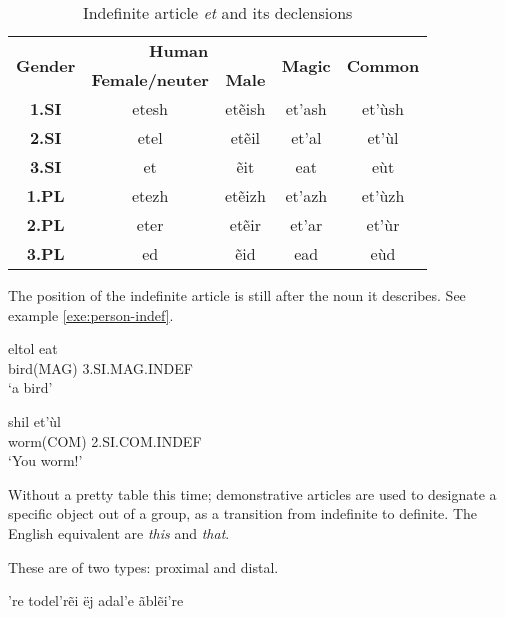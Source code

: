 \begin{table}[h]
\begin{center}\label{tab:morph-indef-pers-suff}
\begin{tabular}{|c||c|c|c|c|}
\hline
\multirow{2}{*}{\textbf{Gender}} & \multicolumn{2}{|c|}{\textbf{Human}} & \multirow{2}{*}{\textbf{Magic}} & \multirow{2}{*}{\textbf{Common}}\\
                                 & \textbf{Female/neuter} & \textbf{Male} & & \\\hline\hline
\textbf{1.SI}                    & etesh & etẽish & et’ash & et’ùsh \\\hline
\textbf{2.SI}                    & etel  & etẽil  & et’al  & et’ùl  \\\hline
\textbf{3.SI}                    & et    & ẽit    & eat    & eùt    \\\hline
\textbf{1.PL}                    & etezh & etẽizh & et’azh & et’ùzh \\\hline
\textbf{2.PL}                    & eter  & etẽir  & et’ar  & et’ùr  \\\hline
\textbf{3.PL}                    & ed    & ẽid    & ead    & eùd    \\\hline
\end{tabular}
\end{center}
\caption{Indefinite article \emph{et} and its declensions}
\end{table}

The position of the indefinite article is still after the noun it describes. See example
\ref{exe:person-indef}.

\begin{exe}
\ex\label{exe:person-indef}
\begin{xlist}
\ex\gll \gls{eltol} eat\\
bird(MAG) 3.SI.MAG.INDEF\\
\trans ‘a bird’

\ex\gll {}\gls{shil} et’ùl\\
worm(COM) 2.SI.COM.INDEF\\
\trans ‘You worm!’
\end{xlist}
\end{exe}

Without a pretty table this time; demonstrative articles are used to designate a specific object out
of a group, as a transition from indefinite to definite. The English equivalent are \emph{this} and
\emph{that}.

These are of two types: proximal and distal.


’re
todel’rẽi
ëj adal’e ãblẽi’re

